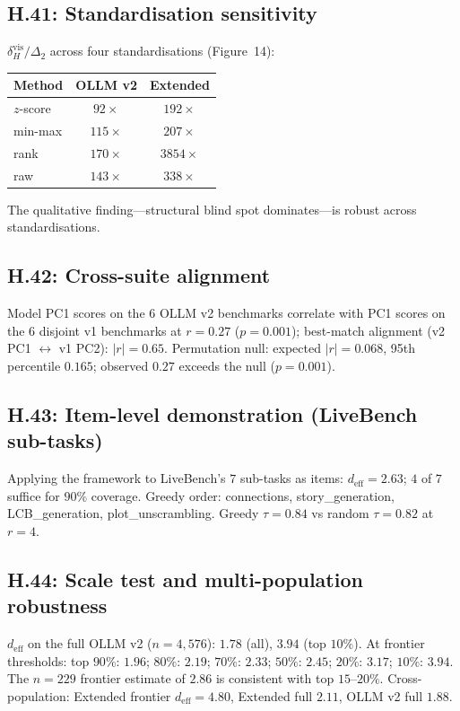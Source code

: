 \documentclass{article}
\begin{document}
\subsection*{H.41: Standardisation sensitivity}
$\delta_H^{\mathrm{vis}} / \Delta_2$ across four standardisations
(Figure~14):
\begin{center}\small
\begin{tabular}{lcc}
\toprule
Method & OLLM v2 & Extended \\
\midrule
$z$-score & $92\times$ & $192\times$ \\
min-max & $115\times$ & $207\times$ \\
rank & $170\times$ & $3854\times$ \\
raw & $143\times$ & $338\times$ \\
\bottomrule
\end{tabular}
\end{center}
The qualitative finding---structural blind spot dominates---is robust
across standardisations.

\subsection*{H.42: Cross-suite alignment}
Model PC1 scores on the $6$ OLLM v2 benchmarks correlate with PC1
scores on the $6$ disjoint v1 benchmarks at $r = 0.27$ ($p = 0.001$);
best-match alignment (v2 PC1 $\leftrightarrow$ v1 PC2): $|r| = 0.65$.
Permutation null: expected $|r| = 0.068$, 95th percentile $0.165$;
observed $0.27$ exceeds the null ($p = 0.001$).

\subsection*{H.43: Item-level demonstration (LiveBench sub-tasks)}
Applying the framework to LiveBench's $7$ sub-tasks as items:
$d_{\mathrm{eff}} = 2.63$; $4$ of $7$ suffice for $90\%$ coverage.
Greedy order: connections, story\_generation, LCB\_generation,
plot\_unscrambling. Greedy $\tau = 0.84$ vs random $\tau = 0.82$
at $r = 4$.

\subsection*{H.44: Scale test and multi-population robustness}
$d_{\mathrm{eff}}$ on the full OLLM v2 ($n = 4{,}576$): $1.78$ (all),
$3.94$ (top $10\%$). At frontier thresholds: top $90\%$: $1.96$;
$80\%$: $2.19$; $70\%$: $2.33$; $50\%$: $2.45$; $20\%$: $3.17$;
$10\%$: $3.94$. The $n = 229$ frontier estimate of $2.86$ is
consistent with top $15$--$20\%$. Cross-population:
Extended frontier $d_{\mathrm{eff}} = 4.80$, Extended full $2.11$,
OLLM v2 full $1.88$.
\end{document}
